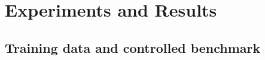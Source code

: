 \documentclass{article}
\begin{document}


\section{Experiments and Results}
\label{sec:setup}

% 
% 


\subsection{Training data and controlled benchmark}
\label{sec:data}
\end{document}
